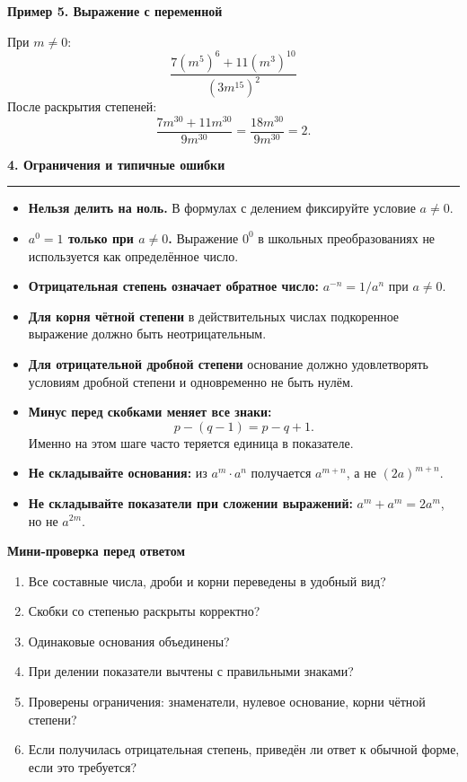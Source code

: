 \documentclass[a4paper,12pt]{article}
\newcommand{\sectionline}{\par\vspace{2pt}\noindent\color{rulegray}\rule{\linewidth}{0.5pt}\color{textgray}\par\vspace{5pt}}
\newcommand{\formula}[1]{\[\displaystyle #1\]}
\newcommand{\exhead}[1]{\par\medskip\textcolor{darkaccent}{\textbf{#1}}\par}
\begin{document}
\exhead{Пример 5. Выражение с переменной}
При $m\ne0$:
\formula{\frac{7(m^5)^6+11(m^3)^{10}}{(3m^{15})^2}}
После раскрытия степеней:
\formula{\frac{7m^{30}+11m^{30}}{9m^{30}}=\frac{18m^{30}}{9m^{30}}=2.}

{\LARGE\bfseries\color{darkaccent}4. Ограничения и типичные ошибки}\par
\sectionline

\begin{itemize}
  \item \textbf{Нельзя делить на ноль.} В формулах с делением фиксируйте условие $a\ne0$.
  \item \textbf{$a^0=1$ только при $a\ne0$.} Выражение $0^0$ в школьных преобразованиях не используется как определённое число.
  \item \textbf{Отрицательная степень означает обратное число:} $a^{-n}=1/a^n$ при $a\ne0$.
  \item \textbf{Для корня чётной степени} в действительных числах подкоренное выражение должно быть неотрицательным.
  \item \textbf{Для отрицательной дробной степени} основание должно удовлетворять условиям дробной степени и одновременно не быть нулём.
  \item \textbf{Минус перед скобками меняет все знаки:}
  \formula{p-(q-1)=p-q+1.}
  Именно на этом шаге часто теряется единица в показателе.
  \item \textbf{Не складывайте основания:} из $a^m\cdot a^n$ получается $a^{m+n}$, а не $(2a)^{m+n}$.
  \item \textbf{Не складывайте показатели при сложении выражений:} $a^m+a^m=2a^m$, но не $a^{2m}$.
\end{itemize}

\exhead{Мини-проверка перед ответом}
\begin{enumerate}
  \item Все составные числа, дроби и корни переведены в удобный вид?
  \item Скобки со степенью раскрыты корректно?
  \item Одинаковые основания объединены?
  \item При делении показатели вычтены с правильными знаками?
  \item Проверены ограничения: знаменатели, нулевое основание, корни чётной степени?
  \item Если получилась отрицательная степень, приведён ли ответ к обычной форме, если это требуется?
\end{enumerate}
\end{document}
